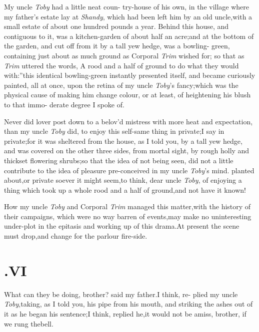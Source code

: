 \documentclass{article}
\begin{document}
My uncle \textit{Toby} had a little neat coun-\break
try-house of his own, in the village where my father’s estate lay at \textit{Shandy},
which had been left him by an old uncle,\break with a small estate of
about one hundred pounds a year. Behind this house, and contiguous
to it, was a kitchen-garden of about half an acre;\tsk and at the
bottom of the garden, and cut off from it\break
by a tall yew hedge, was a bowling-\break 
green, containing just about as much
ground as Corporal
\textit{Trim} wished for;\tsk\break
so that as \textit{Trim} uttered the
words, \lqq A rood and a half of ground to do what\break
they would with:”\tsh this identical bowling-green instantly presented
itself, and became curiously painted, all at once, upon the retina
of my uncle \textit{Toby}’s fancy;\break\tsh which was the physical
cause of making him change colour, or at least, of heightening his
blush to that immo-\break
derate degree I spoke of.

Never did lover post down to a belov’d mistress with more heat
and expectation, than my uncle \textit{Toby} did, to enjoy this
self-same thing in private;\tsk I say in private;\tsk for it was sheltered from the house, as
I told you, by a tall yew hedge, and was covered on the other three
sides, from mortal sight, by rough holly and thickset flowering
shrubs;\tsk so that the
idea of not being seen, did not a little contribute to the
idea of pleasure pre-conceived in my uncle \textit{Toby}’s
mind.\tsk\break 
{}
planted about,\tsh or private soever it\break 
might seem,\tsk to think, dear uncle \textit{Toby}, 
of enjoying a thing which took up a\break
whole rood and a half of ground,\tsk and\break
not have it known!

How my uncle \textit{Toby} and Corporal \textit{Trim} managed this
matter,\tsk with the history of their campaigns, which were no
way barren of events,\tsh may make no uninteresting
under-plot in the epitasis and working up of this drama.\tsk At
present the scene must drop,\tsk and change for the parlour
fire-side.

\bigskip
{}
\newpage
\section{.\enspace  VI}

\quad\tsh What can they be doing,\break
brother? said my father.\tsk I think, re-\break
plied my uncle \textit{Toby},\tsk taking, as I told you,
his pipe from his mouth, and striking the ashes out of it as he
began his sentence;\tsh I think, replied he,\tsk it
would not be amiss, brother, if we rung the\break bell.
\end{document}
